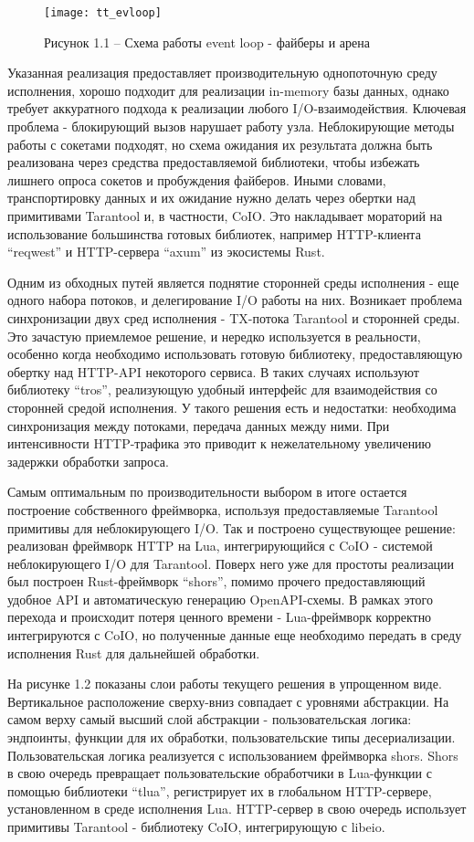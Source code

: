 \documentclass[times,numbers=noenddot]{itmo-student-thesis}
\begin{document}
\begin{figure}[!h]
	\caption*{Рисунок 1.1 -- Схема работы event loop - файберы и арена}\label{fig1}
	\centering
	\texttt{[image: tt\_evloop]}
\end{figure}


Указанная реализация предоставляет производительную однопоточную среду исполнения, хорошо подходит для реализации in-memory базы данных, однако требует аккуратного подхода к реализации любого I/O-взаимодействия.
Ключевая проблема - блокирующий вызов нарушает работу узла.
Неблокирующие методы работы с сокетами подходят, но схема ожидания их результата должна быть реализована через средства предоставляемой библиотеки, чтобы избежать лишнего опроса сокетов и пробуждения файберов.
Иными словами, транспортировку данных и их ожидание нужно делать через обертки над примитивами Tarantool и, в частности, CoIO.
Это накладывает мораторий на использование большинства готовых библиотек, например HTTP-клиента “reqwest” и HTTP-сервера “axum” из экосистемы Rust.

Одним из обходных путей является поднятие сторонней среды исполнения - еще одного набора потоков, и делегирование I/O работы на них.
Возникает проблема синхронизации двух сред исполнения - TX-потока Tarantool и сторонней среды.
Это зачастую приемлемое решение, и нередко используется в реальности, особенно когда необходимо использовать готовую библиотеку, предоставляющую обертку над HTTP-API некоторого сервиса.
В таких случаях используют библиотеку “tros”, реализующую удобный интерфейс для взаимодействия со сторонней средой исполнения.
У такого решения есть и недостатки: необходима синхронизация между потоками, передача данных между ними.
При интенсивности HTTP-трафика это приводит к нежелательному увеличению задержки обработки запроса.

Самым оптимальным по производительности выбором в итоге остается построение собственного фреймворка, используя предоставляемые Tarantool примитивы для неблокирующего I/O.
Так и построено существующее решение: реализован фреймворк HTTP на Lua, интегрирующийся с CoIO - системой неблокирующего I/O для Tarantool.
Поверх него уже для простоты реализации был построен Rust-фреймворк “shors”, помимо прочего предоставляющий удобное API и автоматическую генерацию OpenAPI-схемы.
В рамках этого перехода и происходит потеря ценного времени - Lua-фреймворк корректно интегрируются с CoIO, но полученные данные еще необходимо передать в среду исполнения Rust для дальнейшей обработки.

На рисунке 1.2 показаны слои работы текущего решения в упрощенном виде.
Вертикальное расположение сверху-вниз совпадает с уровнями абстракции.
На самом верху самый высший слой абстракции - пользовательская логика: эндпоинты, функции для их обработки, пользовательские типы десериализации.
Пользовательская логика реализуется с использованием фреймворка shors.
Shors в свою очередь превращает пользовательские обработчики в Lua-функции с помощью библиотеки “tlua”, регистрирует их в глобальном HTTP-сервере, установленном в среде исполнения Lua.
HTTP-сервер в свою очередь использует примитивы Tarantool - библиотеку CoIO, интегрирующую с libeio.
\end{document}
